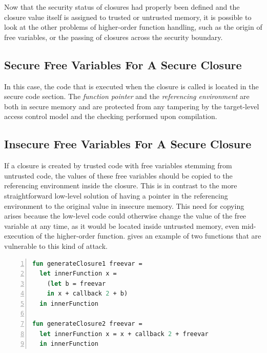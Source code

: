 Now that the security status of closures had properly been defined and the closure value itself is assigned to trusted or untrusted memory, it is possible to look at the other problems of higher-order function handling, such as the origin of free variables, or the passing of closures across the security boundary.





\subsection{Secure Free Variables For A Secure Closure}

In this case, the code that is executed when the closure is called is located in the secure code section.
The \emph{function pointer} and the \emph{referencing environment} are both in secure memory and are protected from any tampering by the target-level access control model and the checking performed upon compilation.

\subsection{Insecure Free Variables For A Secure Closure}
\label{sec:insecurevaluessecureclosure}
If a closure is created by trusted code with free variables stemming from untrusted code, the values of these free variables should be copied to the referencing environment inside the closure. This is in contrast to the more straightforward low-level solution of having a pointer in the referencing environment to the original value in insecure memory.
This need for copying arises because the low-level code could otherwise change the value of the free variable at any time, as it would be located inside untrusted memory, even mid-execution of the higher-order function.
 gives an example of two functions that are vulnerable to this kind of attack.

\begin{lstlisting}[frame=single, language=ML,caption={[Copy Free Variables]Changing free variables inside untrusted memory mid-execution can break contextual equivalence.}, label=code:CopyFreeVariables,numbers=left]
fun generateClosure1 freevar =
  let innerFunction x =
    (let b = freevar
    in x + callback 2 + b)
  in innerFunction

fun generateClosure2 freevar = 
  let innerFunction x = x + callback 2 + freevar
  in innerFunction
\end{lstlisting}

